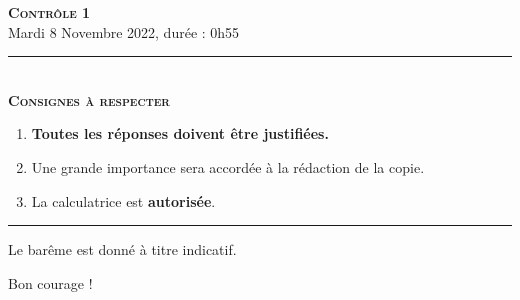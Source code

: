 \documentclass[11pt]{article}
\begin{document}

\begin{center}
\textbf{\LARGE \textsc{Contrôle 1}}\\[2mm]

{\large Mardi 8 Novembre 2022, durée : 0h55}\\[1mm]
\noindent\rule{8cm}{0.4pt}\\[1mm]
\textbf{\textsc{Consignes à respecter}}
\begin{enumerate}[label=\textbf{\arabic*/}]
\item \textbf{Toutes les réponses doivent être justifiées.}
\item Une grande importance sera accordée à la rédaction de la
  copie.
\item La calculatrice est \textbf{autorisée}.
    \end{enumerate}
\noindent\rule{12cm}{0.4pt}
\end{center}

\vspace{2mm}
\noindent Le barême est donné à titre indicatif.
\vspace{2mm}
\begin{center}
  Bon courage !
\end{center}
\end{document}
